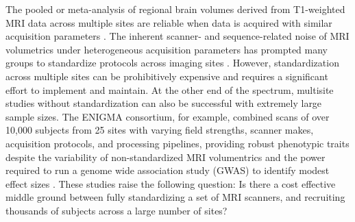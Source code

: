 The pooled  or meta-analysis of regional brain volumes derived from T1-weighted MRI data across multiple sites are reliable when data is acquired with similar acquisition parameters \cite{cannon2014,multicenter01,freesurferReliability}. The inherent scanner- and sequence-related noise of MRI volumetrics under heterogeneous acquisition parameters has prompted many groups to standardize protocols across imaging sites \cite{cannon2014,adniharmonize,ADNIReview}. However, standardization across multiple sites can be prohibitively expensive and requires a significant effort to implement and maintain. %
At the other end of the spectrum, multisite studies without standardization can also be successful with extremely large sample sizes. The ENIGMA consortium, for example, combined scans of over 10,000 subjects from 25 sites with varying field strengths, scanner makes, acquisition protocols, and processing pipelines, providing robust phenotypic traits despite the variability of non-standardized MRI volumentrics and the power required to run a genome wide association study (GWAS) to identify modest effect sizes \cite{thompson2014enigma}. These studies raise the following question: Is there a cost effective middle ground between fully standardizing a set of MRI scanners, and recruiting thousands of subjects across a large number of sites? %
